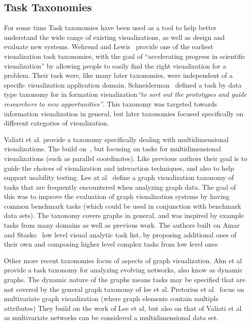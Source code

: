 \documentclass{egpubl}
\begin{document}
\subsection{Task Taxonomies}
For some time Task taxonomies have been  used as a tool to help better understand the wide range of existing visualizations, as well as design and evaluate new systems.
Wehrend and Lewis~\cite{Wehrend1990} provide one of the earliest visualization task taxonomies, with the goal of ``accelerating progress in scientific visualization'' by allowing people to easily find the right visualization for a problem.
Their task were, like many later taxonomies, were independent of a specific visualization application domain.
Schneiderman~\cite{Shneiderman1996} defined a task by data type taxonomy for  in formation visualization\textit{``to sort out the prototypes and guide researchers to new opportunities''}.
This taxonomy was targeted towards information visualization in general, but later taxonomies focused specifically on different categories of visualization.

Valiati et al. provide a taxonomy specifically dealing with multidimensional visualizations. The build on~\cite{Wehrend1990}, but focusing on tasks for multidimensional visualizations  (such as parallel coordinates).
Like previous authors their goal is to guide the choices of visualization and interaction techniques, and also to  help support usability testing.
Lee at al~\cite{Lee2006} define a graph visualization taxonomy of tasks that are frequently encountered when analyzing graph data.
The goal of this was to improve the evaluation of graph visualization systems by having common benchmark tasks (which could be used in conjunction with benchmark data sets).
The taxonomy covers graphs in general, and was inspired by example tasks from many domains as well as previous work.
The authors built on Amar and Stasko~\cite{Amar2005} low level visual analytic task list, by proposing additional ones of their own and composing higher level complex tasks from low level ones


Other more recent taxonomies focus of aspects of graph visualization.
Ahn et al~\cite{Ahn2014} provide a task taxonomy for analyzing evolving networks, also know as dynamic graphs. The dynamic nature of the graphs means tasks may be specified that are  not covered by the general graph taxonomy of lee et al.
Pretorius et al~\cite{Pretorius2014} focus on multivariate graph visualization (where graph elements contain multiple attributes)
They build on the work  of Lee et al, but also on that of  Valiati et al as multivariate networks can be considered a multidimensional data set.
\end{document}
